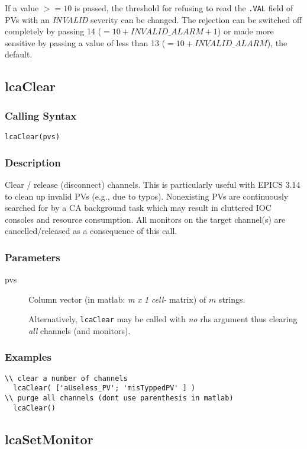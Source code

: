 \documentclass{article}
\newcommand{\com}[1]{{\tt #1}}
\newcommand{\pbrk}{\pagebreak[3]}
\newcommand{\ita}[1]{\emph{#1}}
\newcommand{\m}{$m$}
\newcommand{\mhack}{$m$} %
\newcommand{\mxl}{$m\times 1$}
\renewcommand{\m}{\ita{m}}
\newcommand{\mhack}{\ita{m}} %
\renewcommand{\mxl}{\ita{m x 1}}
\renewcommand{\pbrk}{}
\newcommand{\PVITEM}{
\item[pvs] Column vector (in matlab: \mxl{} \ita{cell-} matrix)
of \mhack{} strings.
}
\begin{document}
If a value $>=10$ is passed, the threshold for refusing to read the \com{.VAL}
field of PVs with an \ita{INVALID} severity can be changed. The rejection
can be switched off completely by passing 14 ($= 10 + INVALID\_ALARM + 1$)
or made more sensitive by passing a value of less than 13 ($=10 + INVALID\_ALARM$),
the default.

\pbrk
\subsection{lcaClear}
\label{lcaclear}
\subsubsection{Calling Syntax}
\begin{verbatim}
lcaClear(pvs)
\end{verbatim}
\subsubsection{Description}
Clear / release (disconnect) channels. This is particularly useful with
EPICS 3.14 to clean up invalid PVs (e.g., due to typos). Nonexisting PVs are
continuously searched for by a CA background task which may result
in cluttered IOC consoles and resource consumption.
All monitors on the target channel(s) are cancelled/released as a
consequence of this call.
\subsubsection{Parameters}
\begin{description}
\PVITEM
Alternatively, \com{lcaClear} may be called with {\em no} rhs argument
thus clearing {\em all} channels (and monitors).
\end{description}
\subsubsection{Examples}
\begin{verbatim}
\\ clear a number of channels
  lcaClear( ['aUseless_PV'; 'misTyppedPV' ] )
\\ purge all channels (dont use parenthesis in matlab)
  lcaClear()
\end{verbatim}

\pbrk
\subsection{lcaSetMonitor}
\label{lcasetmonitor}
\end{document}
